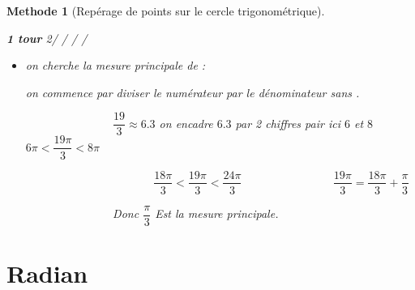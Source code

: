 \documentclass[10pt,a4paper]{article}
\theoremstyle{break}
\newtheorem{Meth}{Methode}
\begin{document}
\begin{Meth}[Repérage de points sur le cercle trigonométrique]
\begin{enumerate}
				\textit{\textbf{1 tour} 2\pi /  /  /  / }

			\begin{itemize}
				\item on cherche la mesure principale de : \par
				on commence par diviser le numérateur par le dénominateur sans \pi.\par
				~~~~~~~~~~~~~~~$\dfrac{19}{3} \approx 6.3$ on encadre $6.3$ par 2 chiffres pair ici $6$ et $8$ $6\pi<\dfrac{19\pi}{3}<8\pi$	\par
				~~~~~~~~~~~~~~~~~~~~~~$\dfrac{18\pi}{3}<\dfrac{19\pi}{3}<\dfrac{24\pi}{3}$
				~~~~~~~~~~~~~~~$\dfrac{19\pi}{3}=\dfrac{18\pi}{3}+\dfrac{\pi}{3}$\par
				~~~~~~~~~~~~~~~Donc $\dfrac{\pi}{3}$ Est la mesure principale.
		\end{itemize}
			\end{enumerate}
		\end{Meth}
	\newpage
		\section{Radian}	
\end{document}
